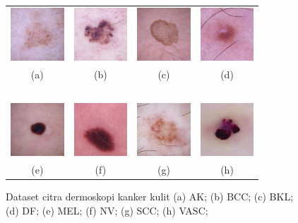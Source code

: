 \begin{figure}[H]
    \centering
    \begin{tabular}{cccc}
        \includegraphics[width=2cm]{../img/Dataset - AK.png}
        &
        \includegraphics[width=2cm]{../img/Dataset - BCC.png}
        &
        \includegraphics[width=2cm]{../img/Dataset - BKL.png}
        &
        \includegraphics[width=2cm]{../img/Dataset - DF.png}\\
        (a) &(b) &(c) &(d)\\
        \  &\  &\  &\ \\
        \includegraphics[width=2cm]{../img/Dataset - MEL.png}
        &
        \includegraphics[width=2cm]{../img/Dataset - NV.png}
        &
        \includegraphics[width=2cm]{../img/Dataset - SCC.png}
        &
        \includegraphics[width=2cm]{../img/Dataset - VASC.png}\\
        (e) &(f) &(g) &(h)\\
    \end{tabular}
    \caption{Dataset citra dermoskopi kanker kulit (a) AK; (b) BCC; (c) BKL; (d) DF; (e) MEL; (f) NV; (g) SCC; (h) VASC;}
    \label{fig:dataset}
\end{figure}

